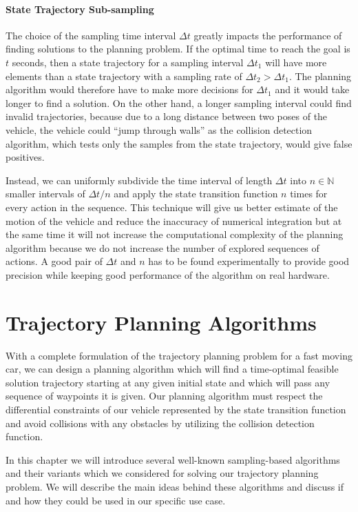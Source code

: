 \paragraph{State Trajectory Sub-sampling}

The choice of the sampling time interval $\Delta t$ greatly impacts the performance of finding solutions to the planning problem. If the optimal time to reach the goal is $t$ seconds, then a state trajectory for a sampling interval $\Delta t_1$ will have more elements than a state trajectory with a sampling rate of $\Delta t_2 > \Delta t_1$. The planning algorithm would therefore have to make more decisions for $\Delta t_1$ and it would take longer to find a solution. On the other hand, a longer sampling interval could find invalid trajectories, because due to a long distance between two poses of the vehicle, the vehicle could ``jump through walls'' as the collision detection algorithm, which tests only the samples from the state trajectory, would give false positives.

Instead, we can uniformly subdivide the time interval of length $\Delta t$ into $n\in\mathbb{N}$ smaller intervals of $\Delta t/n$ and apply the state transition function $n$ times for every action in the sequence. This technique will give us better estimate of the motion of the vehicle and reduce the inaccuracy of numerical integration but at the same time it will not increase the computational complexity of the planning algorithm because we do not increase the number of explored sequences of actions. A good pair of $\Delta t$ and $n$ has to be found experimentally to provide good precision while keeping good performance of the algorithm on real hardware.

\section{Trajectory Planning Algorithms}
\label{sec:trajectory_planning_algorithms}

With a complete formulation of the trajectory planning problem for a fast moving car, we can design a planning algorithm which will find a time-optimal feasible solution trajectory starting at any given initial state and which will pass any sequence of waypoints it is given. Our planning algorithm must respect the differential constraints of our vehicle represented by the state transition function and avoid collisions with any obstacles by utilizing the collision detection function.

In this chapter we will introduce several well-known sampling-based algorithms and their variants which we considered for solving our trajectory planning problem. We will describe the main ideas behind these algorithms and discuss if and how they could be used in our specific use case.

